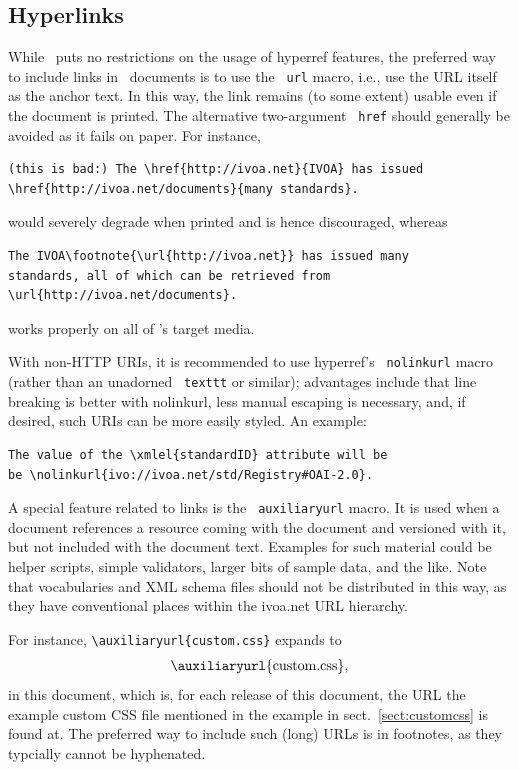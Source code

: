 \documentclass[11pt,a4paper]{ivoa}
\newcommand{\texword}[1]{\texttt{\color{texcolor} #1}}
\begin{document}
\subsection{Hyperlinks}
\label{sect:links}

While \ivoatex\ puts no restrictions on the usage of hyperref features,
the preferred way to include links in \ivoatex\ documents is to use the
\texword{url} macro, i.e., use the URL itself as the anchor text.  In
this way, the link remains (to some extent) usable even if the document
is printed.  The alternative two-argument \texword{href} should
generally be avoided as it fails on paper.  For instance,
\begin{lstlisting}
(this is bad:) The \href{http://ivoa.net}{IVOA} has issued
\href{http://ivoa.net/documents}{many standards}.
\end{lstlisting}
would severely degrade when printed and is hence discouraged, whereas
\begin{lstlisting}
The IVOA\footnote{\url{http://ivoa.net}} has issued many
standards, all of which can be retrieved from
\url{http://ivoa.net/documents}.
\end{lstlisting}
works properly on all of \ivoatex's target media.

With non-HTTP URIs, it is recommended to use hyperref's
\texword{nolinkurl} macro (rather than an unadorned \texword{texttt} or
similar); advantages include that line breaking is better with
nolinkurl, less manual escaping is necessary, and, if desired,
such URIs can be more easily styled.  An example:

\begin{lstlisting}
The value of the \xmlel{standardID} attribute will be
be \nolinkurl{ivo://ivoa.net/std/Registry#OAI-2.0}.
\end{lstlisting}

A special feature related to links is the \texword{auxiliaryurl} macro.
It is used when a document references a resource coming with the
document and versioned with it, but not included with the document text.
Examples for such material could be helper scripts, simple validators,
larger bits of sample data, and the like.  Note that vocabularies and
XML schema files should not be distributed in this way, as they have
conventional places within the ivoa.net URL hierarchy.

For instance, \verb|\auxiliaryurl{custom.css}| expands to
$$\hbox{\auxiliaryurl{custom.css},}$$ in this document,
which is, for each release of this
document, the URL the example custom CSS file mentioned in the example
in sect.~\ref{sect:customcss} is found at.  The preferred way to include
such (long) URLs is in footnotes, as they typcially cannot be hyphenated.
\end{document}

